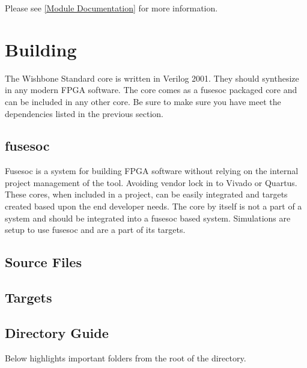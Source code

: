 Please see \ref{Module Documentation} for more information.

\section{Building}

\par
The Wishbone Standard core is written in Verilog 2001. They should synthesize in any modern FPGA software. The core comes as a fusesoc packaged core and can be
included in any other core. Be sure to make sure you have meet the dependencies listed in the previous section.

\subsection{fusesoc}
\par
Fusesoc is a system for building FPGA software without relying on the internal project management of the tool. Avoiding vendor lock in to Vivado or Quartus.
These cores, when included in a project, can be easily integrated and targets created based upon the end developer needs. The core by itself is not a part of
a system and should be integrated into a fusesoc based system. Simulations are setup to use fusesoc and are a part of its targets.

\subsection{Source Files}



\subsection{Targets}



\subsection{Directory Guide}

\par
Below highlights important folders from the root of the directory.

